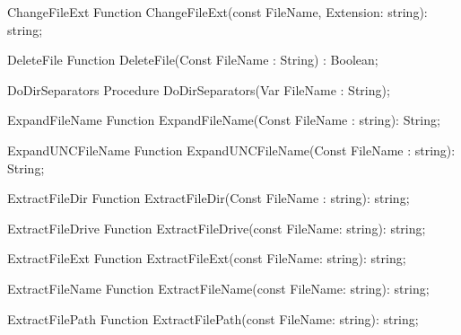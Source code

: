       
  
\begin{function}{ChangeFileExt}
\Declaration
Function ChangeFileExt(const FileName, Extension: string): string;
\Description
\Errors
\SeeAlso
\end{function}

 
\begin{function}{DeleteFile}
\Declaration
Function DeleteFile(Const FileName : String) : Boolean;
\Description
\Errors
\SeeAlso
\end{function}

 
\begin{procedure}{DoDirSeparators}
\Declaration
Procedure DoDirSeparators(Var FileName : String);
\Description
\Errors
\SeeAlso
\end{procedure}

 
\begin{function}{ExpandFileName}
\Declaration
Function ExpandFileName(Const FileName : string): String;
\Description
\Errors
\SeeAlso
\end{function}

 
\begin{function}{ExpandUNCFileName}
\Declaration
Function ExpandUNCFileName(Const FileName : string): String;
\Description
\Errors
\SeeAlso
\end{function}

 
\begin{function}{ExtractFileDir}
\Declaration
Function ExtractFileDir(Const FileName : string): string;
\Description
\Errors
\SeeAlso
\end{function}

 
\begin{function}{ExtractFileDrive}
\Declaration
Function ExtractFileDrive(const FileName: string): string;
\Description
\Errors
\SeeAlso
\end{function}

 
\begin{function}{ExtractFileExt}
\Declaration
Function ExtractFileExt(const FileName: string): string; 
\Description
\Errors
\SeeAlso
\end{function}

 
\begin{function}{ExtractFileName}
\Declaration
Function ExtractFileName(const FileName: string): string;
\Description
\Errors
\SeeAlso
\end{function}

 
\begin{function}{ExtractFilePath}
\Declaration
Function ExtractFilePath(const FileName: string): string;
\Description
\Errors
\SeeAlso
\end{function}

